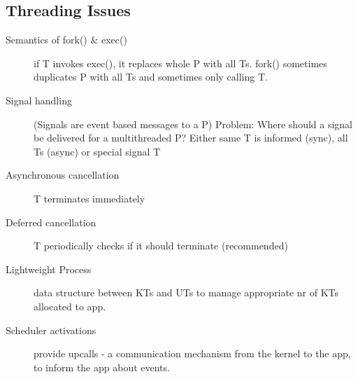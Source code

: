\subsection*{Threading Issues}
\begin{description}
\item[Semantics of fork() \& exec()] if T invokes exec(), it replaces whole P with all Ts. fork() sometimes duplicates P with all Ts and sometimes only calling T.
  \item[Signal handling] (Signals are event based messages to a P) Problem: Where should a signal be delivered for a multithreaded P? Either same T is informed (sync), all Ts (async) or special signal T
  \item[Asynchronous cancellation] T terminates immediately
  \item[Deferred cancellation] T periodically checks if it should terminate (recommended)
  \item[Lightweight Process]data structure between KTs and UTs to manage appropriate nr of KTs allocated to app.
  \item[Scheduler activations] provide upcalls - a communication mechanism from the kernel to the app, to inform the app about events.
\end{description}
